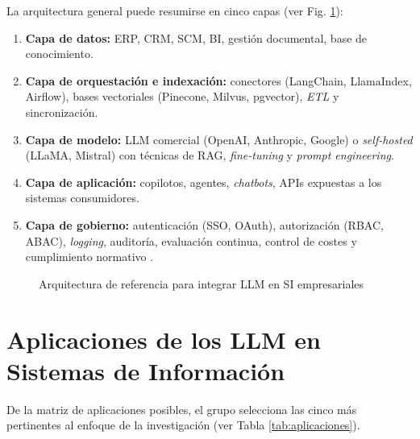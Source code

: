 \documentclass[12pt,a4paper,oneside]{article}
\begin{document}
La arquitectura general puede resumirse en cinco capas (ver Fig. \ref{fig:arquitectura}):

\begin{enumerate}[leftmargin=*]
    \item \textbf{Capa de datos:} ERP, CRM, SCM, BI, gestión documental, base de conocimiento.
    \item \textbf{Capa de orquestación e indexación:} conectores (LangChain, LlamaIndex, Airflow), bases vectoriales (Pinecone, Milvus, pgvector), \textit{ETL} y sincronización.
    \item \textbf{Capa de modelo:} LLM comercial (OpenAI, Anthropic, Google) o \textit{self-hosted} (LLaMA, Mistral) con técnicas de RAG, \textit{fine-tuning} y \textit{prompt engineering}.
    \item \textbf{Capa de aplicación:} copilotos, agentes, \textit{chatbots}, APIs expuestas a los sistemas consumidores.
    \item \textbf{Capa de gobierno:} autenticación (SSO, OAuth), autorización (RBAC, ABAC), \textit{logging}, auditoría, evaluación continua, control de costes y cumplimiento normativo \cite{owaspTop10LLM2025}.
\end{enumerate}

\begin{figure}[h!]
\centering
{}
\caption{Arquitectura de referencia para integrar LLM en SI empresariales}
\label{fig:arquitectura}
\end{figure}

\section{Aplicaciones de los LLM en Sistemas de Información}

De la matriz de aplicaciones posibles, el grupo selecciona las cinco más pertinentes al enfoque de la investigación (ver Tabla \ref{tab:aplicaciones}).
\end{document}
